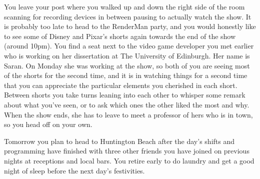 \documentclass[../main.tex]{subfiles}
\begin{document}
You leave your post where you walked up and down the right side of the room scanning for recording devices in between pausing to actually watch the show. It is probably too late to head to the RenderMan party, and you would honestly like to see some of Disney and Pixar's shorts again towards the end of the show (around 10pm). You find a seat next to the video game developer you met earlier who is working on her dissertation at The University of Edinburgh. Her name is Saran. On Monday she was working at the show, so both of you are seeing most of the shorts for the second time, and it is in watching things for a second time that you can appreciate the particular elements you cherished in each short. Between shorts you take turns leaning into each other to whisper some remark about what you've seen, or to ask which ones the other liked the most and why. When the show ends, she has to leave to meet a professor of hers who is in town, so you head off on your own.

Tomorrow you plan to head to Huntington Beach after the day's shifts and programming have finished with three other friends you have joined on previous nights at receptions and local bars. You retire early to do laundry and get a good night of sleep before the next day's festivities.
\end{document}
